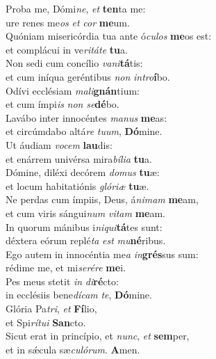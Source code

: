 \evenverse Proba me, Dómi\textit{ne}, \textit{et} \textbf{ten}ta me:~\*\\
\evenverse ure renes me\textit{os} \textit{et} \textit{cor} \textbf{me}um.\\
\oddverse Quóniam misericórdia tua ante ó\textit{cu}\textit{los} \textbf{me}os est:~\*\\
\oddverse et complácui in ve\textit{ri}\textit{tá}\textit{te} \textbf{tu}a.\\
\evenverse Non sedi cum concílio \textit{va}\textit{ni}\textbf{tá}tis:~\*\\
\evenverse et cum iníqua geréntibus \textit{non} \textit{in}\textit{tro}\textbf{í}bo.\\
\oddverse Odívi ecclésiam \textit{ma}\textit{li}\textbf{gnán}tium:~\*\\
\oddverse et cum ímpi\textit{is} \textit{non} \textit{se}\textbf{dé}bo.\\
\evenverse Lavábo inter innocéntes \textit{ma}\textit{nus} \textbf{me}as:~\*\\
\evenverse et circúmdabo altá\textit{re} \textit{tu}\textit{um}, \textbf{Dó}mine.\\
\oddverse Ut áudiam \textit{vo}\textit{cem} \textbf{lau}dis:~\*\\
\oddverse et enárrem univérsa mira\textit{bí}\textit{li}\textit{a} \textbf{tu}a.\\
\evenverse Dómine, diléxi decórem \textit{do}\textit{mus} \textbf{tu}æ:~\*\\
\evenverse et locum habitatiónis \textit{gló}\textit{ri}\textit{æ} \textbf{tu}æ.\\
\oddverse Ne perdas cum ímpiis, Deus, á\textit{ni}\textit{mam} \textbf{me}am,~\*\\
\oddverse et cum viris sángui\textit{num} \textit{vi}\textit{tam} \textbf{me}am.\\
\evenverse In quorum mánibus i\textit{ni}\textit{qui}\textbf{tá}tes sunt:~\*\\
\evenverse déxtera eórum replé\textit{ta} \textit{est} \textit{mu}\textbf{né}ribus.\\
\oddverse Ego autem in innocéntia me\textit{a} \textit{in}\textbf{grés}sus sum:~\*\\
\oddverse rédime me, et mi\textit{se}\textit{ré}\textit{re} \textbf{me}i.\\
\evenverse Pes meus stetit \textit{in} \textit{di}\textbf{ré}cto:~\*\\
\evenverse in ecclésiis bene\textit{dí}\textit{cam} \textit{te}, \textbf{Dó}mine.\\
\oddverse Glória Pa\textit{tri}, \textit{et} \textbf{Fí}lio,~\*\\
\oddverse et Spi\textit{rí}\textit{tu}\textit{i} \textbf{San}cto.\\
\evenverse Sicut erat in princípio, et \textit{nunc}, \textit{et} \textbf{sem}per,~\*\\
\evenverse et in sǽcula sæ\textit{cu}\textit{ló}\textit{rum}. \textbf{A}men.\\
